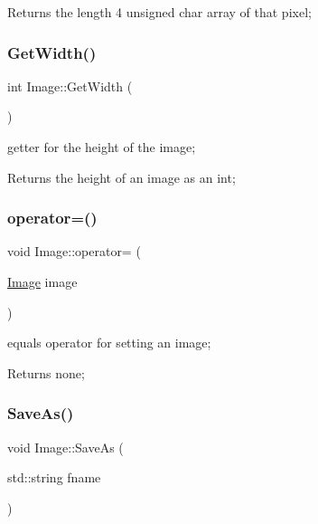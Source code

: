 \begin{DoxyReturn}{Returns}
the length 4 unsigned char array of that pixel; 
\end{DoxyReturn}
\mbox{\label{classImage_a4ab80d76fd124fd9de9b4fca8ae16186}} 
\subsubsection{\texorpdfstring{Get\+Width()}{GetWidth()}}
{\footnotesize\ttfamily int Image\+::\+Get\+Width (\begin{DoxyParamCaption}{ }\end{DoxyParamCaption})}



getter for the height of the image; 

\begin{DoxyReturn}{Returns}
the height of an image as an int; 
\end{DoxyReturn}
\mbox{\label{classImage_ad87aee5af20779f84891b08b23319ce2}} 
\subsubsection{\texorpdfstring{operator=()}{operator=()}}
{\footnotesize\ttfamily void Image\+::operator= (\begin{DoxyParamCaption}\item[{\hyperlink{classImage}{Image}}]{image }\end{DoxyParamCaption})}



equals operator for setting an image; 

\begin{DoxyReturn}{Returns}
none; 
\end{DoxyReturn}
\mbox{\label{classImage_a7884b109eec6cdc52295011f4e0552fd}} 
\subsubsection{\texorpdfstring{Save\+As()}{SaveAs()}}
{\footnotesize\ttfamily void Image\+::\+Save\+As (\begin{DoxyParamCaption}\item[{std\+::string}]{fname }\end{DoxyParamCaption})}



